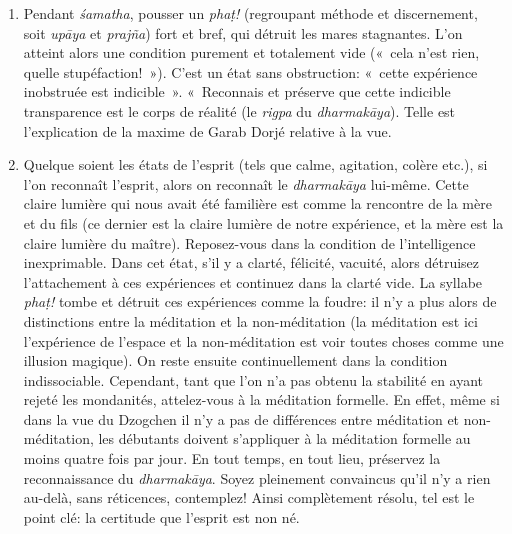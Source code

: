 \documentclass[a4paper]{article}
\begin{document}
\begin{enumerate}

  \item Pendant \emph{\'{s}amatha}, pousser un \emph{pha\d{t}!}
        (regroupant méthode et discernement, soit \emph{up\={a}ya} et
        \emph{prajña}) fort et bref, qui détruit les mares
        stagnantes. L'on atteint alors une condition purement et
        totalement vide («~cela n'est rien, quelle
        stupéfaction!~»). C'est un état sans obstruction: «~cette
        expérience inobstruée est indicible~». «~Reconnais et préserve
        que cette indicible transparence est le corps de réalité (le
        \emph{rigpa} du \emph{dharmak\={a}ya}). Telle est l'explication de
        la maxime de Garab Dorjé relative à la vue.

  \item Quelque soient les états de l'esprit (tels que calme,
        agitation, colère etc.), si l'on reconnaît l'esprit, alors on
        reconnaît le \emph{dharmak\={a}ya} lui-même. Cette claire
        lumière qui nous avait été familière est comme la rencontre de
        la mère et du fils (ce dernier est la claire lumière de notre
        expérience, et la mère est la claire lumière du
        maître). Reposez-vous dans la condition de l'intelligence
        inexprimable. Dans cet état, s'il y a clarté, félicité,
        vacuité, alors détruisez l'attachement à ces expériences et
        continuez dans la clarté vide. La syllabe \emph{pha\d{t}!}
        tombe et détruit ces expériences comme la foudre: il n'y a
        plus alors de distinctions entre la méditation et la
        non-méditation (la méditation est ici l'expérience de l'espace
        et la non-méditation est voir toutes choses comme une illusion
        magique). On reste ensuite continuellement dans la condition
        indissociable. Cependant, tant que l'on n'a pas obtenu la
        stabilité en ayant rejeté les mondanités, attelez-vous à la
        méditation formelle. En effet, même si dans la vue du Dzogchen
        il n'y a pas de différences entre méditation et
        non-méditation, les débutants doivent s'appliquer à la
        méditation formelle au moins quatre fois par jour. En tout
        temps, en tout lieu, préservez la reconnaissance du
        \emph{dharmak\={a}ya}. Soyez pleinement convaincus qu'il n'y a
        rien au-delà, sans réticences, contemplez! Ainsi complètement
        résolu, tel est le point clé: la certitude que l'esprit est
        non né.


\end{enumerate}
\end{document}
